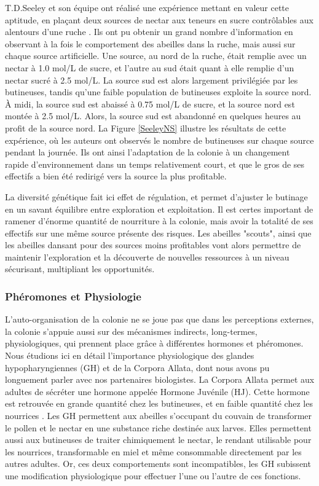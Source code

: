 			 T.D.Seeley et son équipe ont réalisé une expérience mettant en valeur cette aptitude, en plaçant deux sources de nectar aux teneurs en sucre contrôlables aux alentours d'une ruche \cite{seeley_collective_1991}. Ils ont pu obtenir un grand nombre d'information en observant à la fois le comportement des abeilles dans la ruche, mais aussi sur chaque source artificielle. Une source, au nord de la ruche, était remplie avec un nectar à 1.0 mol/L de sucre, et l'autre au sud était quant à elle remplie d'un nectar sucré à 2.5 mol/L. 
			La source sud est alors largement privilégiée par les butineuses, tandis qu'une faible population de butineuses exploite la source nord. À midi, la source sud est abaissé à 0.75 mol/L de sucre, et la source nord est montée à 2.5 mol/L. Alors, la source sud est abandonné en quelques heures au profit de la source nord. La Figure \ref{SeeleyNS} illustre les résultats de cette expérience, où les auteurs ont observés le nombre de butineuses sur chaque source pendant la journée. Ils ont ainsi l'adaptation de la colonie à un changement rapide d'environnement dans un temps relativement court, et que le gros de ses effectifs a bien été redirigé vers la source la plus profitable.
			
			La diversité génétique fait ici effet de régulation, et permet d'ajuster le butinage en un savant équilibre entre exploration et exploitation. Il est certes important de ramener d'énorme quantité de nourriture à la colonie, mais avoir la totalité de ses effectifs sur une même source présente des risques. Les abeilles "scouts", ainsi que les abeilles dansant pour des sources moins profitables vont alors permettre de maintenir l'exploration et la découverte de nouvelles ressources à un niveau sécurisant, multipliant les opportunités.
			
		\subsubsection{Phéromones et Physiologie}
			\label{subsubPhysio}
			L'auto-organisation de la colonie ne se joue pas que dans les perceptions externes, la colonie s'appuie aussi sur des mécanismes indirects, long-termes, physiologiques, qui prennent place grâce à différentes hormones et phéromones.  Nous étudions ici en détail l'importance physiologique des glandes hypopharyngiennes (GH) et de la Corpora Allata, dont nous avons pu longuement parler avec nos partenaires biologistes. La Corpora Allata permet aux adultes de sécréter une hormone appelée Hormone Juvénile (HJ). Cette hormone est retrouvée en grande quantité chez les butineuses, et en faible quantité chez les nourrices \cite{le_conte_primer_2001}. Les GH permettent aux abeilles s'occupant du couvain de transformer le pollen et le nectar en une substance riche destinée aux larves. Elles permettent aussi aux butineuses de traiter chimiquement le nectar, le rendant utilisable pour les nourrices, transformable en miel et même consommable directement par les autres adultes. Or, ces deux comportements sont incompatibles, les GH subissent une modification physiologique pour effectuer l'une ou l'autre de ces fonctions. 
			
